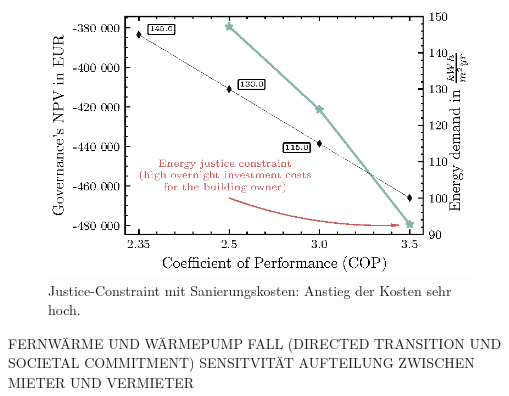 \begin{figure}[h]
	\centering
	\includegraphics[width=0.75\linewidth]{figures/4_Results/fig_renovation_sens/renovation.eps}
	\caption{Justice-Constraint mit Sanierungskosten: Anstieg der Kosten sehr hoch.}
	\label{fig:cop1}
\end{figure}

FERNWÄRME UND WÄRMEPUMP FALL (DIRECTED TRANSITION UND SOCIETAL COMMITMENT) SENSITVITÄT AUFTEILUNG ZWISCHEN MIETER UND VERMIETER


